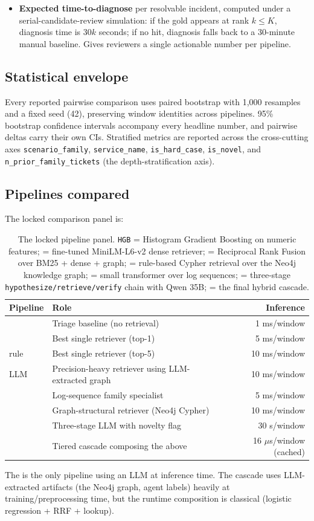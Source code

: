 \begin{itemize}
\item \textbf{Expected time-to-diagnose} per resolvable incident, computed under a serial-candidate-review simulation: if the gold appears at rank $k \leq K$, diagnosis time is $30k$ seconds; if no hit, diagnosis falls back to a 30-minute manual baseline. Gives reviewers a single actionable number per pipeline.
\end{itemize}

\subsection{Statistical envelope}

Every reported pairwise comparison uses paired bootstrap with 1{,}000 resamples and a fixed seed (42), preserving window identities across pipelines. 95\% bootstrap confidence intervals accompany every headline number, and pairwise deltas carry their own CIs. Stratified metrics are reported across the cross-cutting axes \texttt{scenario\_family}, \texttt{service\_name}, \texttt{is\_hard\_case}, \texttt{is\_novel}, and \texttt{n\_prior\_family\_tickets} (the depth-stratification axis).

\subsection{Pipelines compared}

The locked comparison panel is:

\begin{table}[h]
\centering
\caption{The locked pipeline panel. \texttt{HGB} = Histogram Gradient Boosting on numeric features; \bienc{} = fine-tuned MiniLM-L6-v2 dense retriever; \hrrf{} = Reciprocal Rank Fusion over BM25 + dense + graph; \kgret{} = rule-based Cypher retrieval over the Neo4j knowledge graph; \logseq{} = small transformer over log sequences; \agent{} = three-stage \texttt{hypothesize/retrieve/verify} chain with Qwen 35B; \tch{} = the final hybrid cascade.}
\label{tab:pipeline-panel}
\small
\begin{tabularx}{\linewidth}{l X r}
\toprule
Pipeline & Role & Inference \\
\midrule
\hgb{} & Triage baseline (no retrieval) & 1 ms/window \\
\bienc{} & Best single retriever (top-1) & 5 ms/window \\
\hrrf{} rule & Best single retriever (top-5) & 10 ms/window \\
\hrrf{} LLM & Precision-heavy retriever using LLM-extracted graph & 10 ms/window \\
\logseq{} & Log-sequence family specialist & 5 ms/window \\
\kgret{} & Graph-structural retriever (Neo4j Cypher) & 10 ms/window \\
\agent{} & Three-stage LLM with novelty flag & 30 s/window \\
\midrule
\tch{} & Tiered cascade composing the above & 16 $\mu$s/window (cached) \\
\bottomrule
\end{tabularx}
\end{table}

The \agent{} is the only pipeline using an LLM at inference time. The cascade uses LLM-extracted artifacts (the Neo4j graph, agent labels) heavily at training/preprocessing time, but the runtime composition is classical (logistic regression + RRF + lookup).
